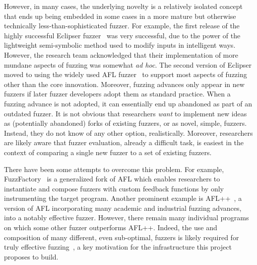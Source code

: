 However, in many cases,
the underlying novelty is a relatively isolated concept that ends up being 
embedded in some cases in a more mature but otherwise technically
less-than-sophisticated fuzzer.  For example, 
the first release of the highly successful Eclipser fuzzer~\cite{Eclipser} was very successful, 
due to the power of the lightweight semi-symbolic method used to modify 
inputs in intelligent ways.  However, the research team acknowledged that their 
implementation of more mundane aspects of fuzzing was somewhat \emph{ad hoc}.  The 
second version of Eclipser moved to using the widely used AFL fuzzer~\cite{aflfuzz} to support 
most aspects of fuzzing other than the core innovation.  
Moreover, fuzzing advances only appear in new fuzzers 
if later fuzzer developers adopt them as standard practice. When a 
fuzzing advance is not adopted, it can
essentially end up abandoned as part of an outdated fuzzer.   It is
not obvious that researchers \emph{want} to implement new ideas as
(potentially abandoned) forks of existing fuzzers, or as novel,
simple, fuzzers.  Instead, they do not know of any other option,
realistically.  Moreover, researchers are likely aware that fuzzer
evaluation, already a difficult task, is easiest in the context of
comparing a single new fuzzer to a set of existing fuzzers.

There have been some attempts to overcome this problem. For example, 
FuzzFactory~\cite{fuzzfactory} is a generalized fork of AFL which enables researchers 
to instantiate and compose fuzzers with custom feedback functions by only 
instrumenting the target program. Another prominent example is AFL++~\cite{AFLplusplus}, a 
version of AFL incorporating many academic and industrial fuzzing advances, 
into a notably effective fuzzer.  However, there remain many individual 
programs on which some other fuzzer outperforms AFL++. Indeed, the use and
composition of 
many different, even sub-optimal, fuzzers is likely required for truly 
effective fuzzing~\cite{chen2019enfuzz,UsesDiversity,ensemble,pastis}, a key
motivation for the infrastructure this project proposes to build.

